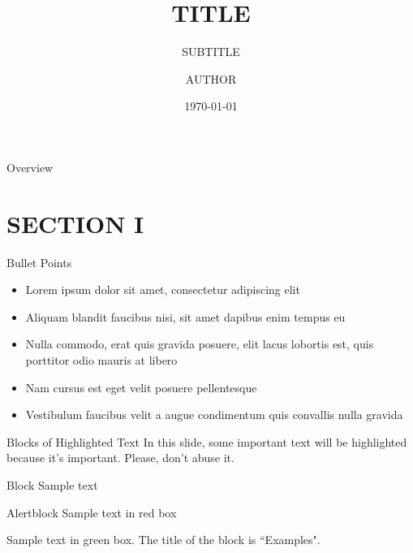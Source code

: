 \documentclass[aspectratio=169,xcolor=dvipsnames]{beamer}
\title{TITLE}
\subtitle{SUBTITLE}
\author{AUTHOR}
\institute
{
   DEPARTMENT \\
   INSTITUTE
}
\date{\today} %
\begin{document}
\begin{frame}
    \titlepage
\end{frame}

\begin{frame}{Overview}
    \tableofcontents
\end{frame}

\section{SECTION I}

\begin{frame}{Bullet Points}
    \begin{itemize}
        \item Lorem ipsum dolor sit amet, consectetur adipiscing elit
        \item Aliquam blandit faucibus nisi, sit amet dapibus enim tempus eu
        \item Nulla commodo, erat quis gravida posuere, elit lacus lobortis est, quis porttitor odio mauris at libero
        \item Nam cursus est eget velit posuere pellentesque
        \item Vestibulum faucibus velit a augue condimentum quis convallis nulla gravida
    \end{itemize}
\end{frame}


\begin{frame}{Blocks of Highlighted Text}
    In this slide, some important text will be \alert{highlighted} because it's important. Please, don't abuse it.

    \begin{block}{Block}
        Sample text
    \end{block}

    \begin{alertblock}{Alertblock}
        Sample text in red box
    \end{alertblock}

    \begin{examples}
        Sample text in green box. The title of the block is ``Examples".
    \end{examples}
\end{frame}
\end{document}
